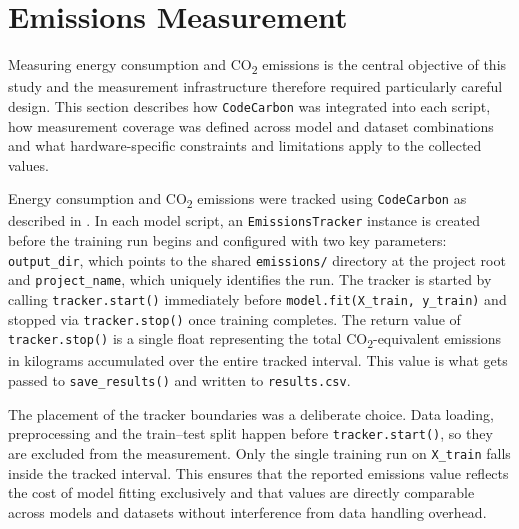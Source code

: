 \section{Emissions Measurement}
\label{implementation_emissions}

Measuring energy consumption and CO\textsubscript{2} emissions is the central objective of this study and the measurement infrastructure therefore required particularly careful design. This section describes how \texttt{CodeCarbon} was integrated into each script, how measurement coverage was defined across model and dataset combinations and what hardware-specific constraints and limitations apply to the collected values.

Energy consumption and CO\textsubscript{2} emissions were tracked using \texttt{CodeCarbon} as described in . In each model script, an \texttt{EmissionsTracker} instance is created before the training run begins and configured with two key parameters: \texttt{output\_dir}, which points to the shared \texttt{emissions/} directory at the project root and \texttt{project\_name}, which uniquely identifies the run. The tracker is started by calling \texttt{tracker.start()} immediately before \texttt{model.fit(X\_train, y\_train)} and stopped via \texttt{tracker.stop()} once training completes. The return value of \texttt{tracker.stop()} is a single float representing the total CO\textsubscript{2}-equivalent emissions in kilograms accumulated over the entire tracked interval. This value is what gets passed to \texttt{save\_results()} and written to \texttt{results.csv}.

The placement of the tracker boundaries was a deliberate choice. Data loading, preprocessing and the train--test split happen before \texttt{tracker.start()}, so they are excluded from the measurement. Only the single training run on \texttt{X\_train} falls inside the tracked interval. This ensures that the reported emissions value reflects the cost of model fitting exclusively and that values are directly comparable across models and datasets without interference from data handling overhead.


